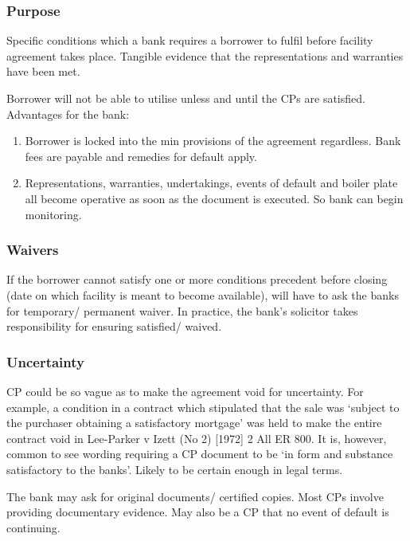 \documentclass[
]{article}
\providecommand{\tightlist}{%
  \setlength{\itemsep}{0pt}\setlength{\parskip}{0pt}}
\begin{document}
\hypertarget{purpose}{%
\subsubsection{Purpose}\label{purpose}}

Specific conditions which a bank requires a borrower to fulfil before
facility agreement takes place. Tangible evidence that the
representations and warranties have been met.

Borrower will not be able to utilise unless and until the CPs are
satisfied. Advantages for the bank:

\begin{enumerate}
\tightlist
\item
  Borrower is locked into the min provisions of the agreement
  regardless. Bank fees are payable and remedies for default apply.
\item
  Representations, warranties, undertakings, events of default and
  boiler plate all become operative as soon as the document is executed.
  So bank can begin monitoring.
\end{enumerate}

\hypertarget{waivers}{%
\subsubsection{Waivers}\label{waivers}}

If the borrower cannot satisfy one or more conditions precedent before
closing (date on which facility is meant to become available), will have
to ask the banks for temporary/ permanent waiver. In practice, the
bank's solicitor takes responsibility for ensuring satisfied/ waived.

\hypertarget{uncertainty}{%
\subsubsection{Uncertainty}\label{uncertainty}}

CP could be so vague as to make the agreement void for uncertainty. For
example, a condition in a contract which stipulated that the sale was
`subject to the purchaser obtaining a satisfactory mortgage' was held to
make the entire contract void in Lee-Parker v Izett (No 2) {[}1972{]} 2
All ER 800. It is, however, common to see wording requiring a CP
document to be `in form and substance satisfactory to the banks'. Likely
to be certain enough in legal terms.

The bank may ask for original documents/ certified copies. Most CPs
involve providing documentary evidence. May also be a CP that no event
of default is continuing.
\end{document}

